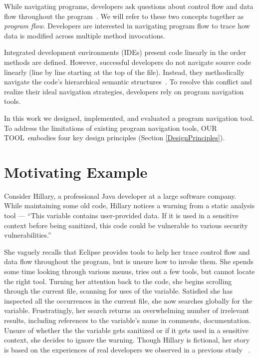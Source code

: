 \documentclass[conference]{IEEEtran}
\newcommand{\toolName}{OUR TOOL}
\begin{document}
While navigating programs, developers ask questions about control flow and data flow throughout the program~\cite{latoza2010hard, Smith2015}. We will refer to these two concepts together as \textit{program flow}. Developers are interested in navigating program flow to trace how data is modified across multiple method invocations.

Integrated development environments (IDEs) present code linearly in the order methods are defined. However, successful developers do not navigate source code linearly (line by line starting at the top of the file). Instead, they methodically navigate the code's hierarchical semantic structures~\cite{robillard2004investigate}. To resolve this conflict and realize their ideal navigation strategies, developers rely on program navigation tools. 


In this work we designed, implemented, and evaluated a program navigation tool.
To address the limitations of existing program navigation tools, \toolName~embodies four key design principles (Section \ref{DesignPrinciples}).

\section{Motivating Example}
Consider Hillary, a professional Java developer at a large software company.
While maintaining some old code, Hillary notices a warning from a static analysis tool --- ``This variable contains user-provided data. If it is used in a sensitive context before being sanitized, this code could be vulnerable to various security vulnerabilities.''

She vaguely recalls that Eclipse provides tools to help her trace control flow and data flow throughout the program, but is unsure how to invoke them.
She spends some time looking through various menus, tries out a few tools, but cannot locate the right tool.
Turning her attention back to the code, she begins scrolling through the current file, scanning for uses of the variable. 
Satisfied she has inspected all the occurrences in the current file, she now searches globally for the variable.
Frustratingly, her search returns an overwhelming number of irrelevant results, including references to the variable's name in comments, documentation.
Unsure of whether the the variable gets sanitized or if it gets used in a sensitive context, she decides to ignore the warning.
Though Hillary is fictional, her story is based on the experiences of real developers we observed in a previous study~\cite{Smith2015} .
\end{document}
